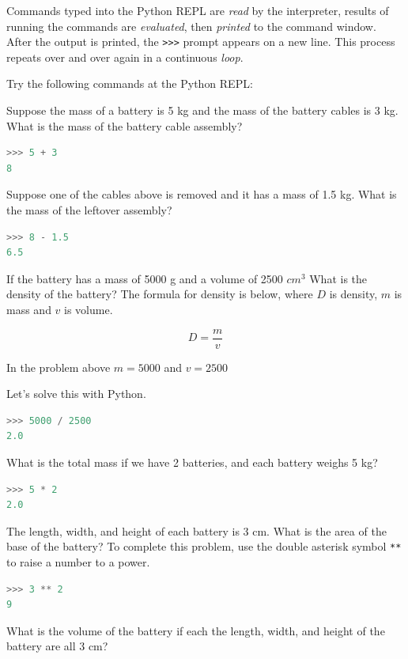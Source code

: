 \documentclass{book}
\begin{document}
Commands typed into the Python REPL are \emph{read} by the interpreter,
results of running the commands are \emph{evaluated}, then
\emph{printed} to the command window. After the output is printed, the
\lstinline!>>>! prompt appears on a new line. This process repeats over
and over again in a continuous \emph{loop}.

Try the following commands at the Python REPL:

Suppose the mass of a battery is 5 kg and the mass of the battery cables
is 3 kg. What is the mass of the battery cable assembly?

\begin{lstlisting}[language=Python]
>>> 5 + 3
8
\end{lstlisting}

Suppose one of the cables above is removed and it has a mass of 1.5 kg.
What is the mass of the leftover assembly?

\begin{lstlisting}[language=Python]
>>> 8 - 1.5
6.5
\end{lstlisting}

If the battery has a mass of 5000 g and a volume of 2500 \(cm^3\) What
is the density of the battery? The formula for density is below, where
\(D\) is density, \(m\) is mass and \(v\) is volume.

\[ D = \frac{m}{v} \]

In the problem above \(m = 5000\) and \(v=2500\)

Let's solve this with Python.

\begin{lstlisting}[language=Python]
>>> 5000 / 2500
2.0
\end{lstlisting}

What is the total mass if we have 2 batteries, and each battery weighs 5
kg?

\begin{lstlisting}[language=Python]
>>> 5 * 2
2.0
\end{lstlisting}

The length, width, and height of each battery is 3 cm. What is the area
of the base of the battery? To complete this problem, use the double
asterisk symbol \lstinline!**! to raise a number to a power.

\begin{lstlisting}[language=Python]
>>> 3 ** 2
9
\end{lstlisting}

What is the volume of the battery if each the length, width, and height
of the battery are all 3 cm?
\end{document}
